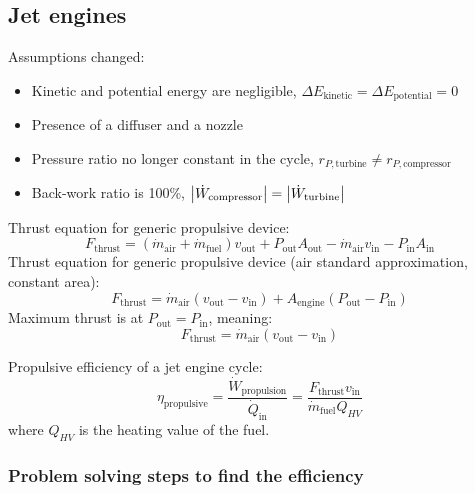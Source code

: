 \documentclass[10pt, twocolumn]{article}
\begin{document}
\subsection{Jet engines}
Assumptions changed:
\begin{itemize}
  \item Kinetic and potential energy are negligible, \(\Delta E_\mathrm{kinetic} = \Delta E_\mathrm{potential} = 0\)
  \item Presence of a diffuser and a nozzle
  \item Pressure ratio no longer constant in the cycle, \(r_{P,\mathrm{turbine}} \neq r_{P,\mathrm{compressor}}\)
  \item Back-work ratio is 100\%, \(\left| \dot{W}_\mathrm{compressor} \right| = \left| \dot{W}_\mathrm{turbine} \right|\)
\end{itemize}

Thrust equation for generic propulsive device:
\[
  F_\mathrm{thrust} = (\dot{m}_\mathrm{air} + \dot{m}_\mathrm{fuel})v_\mathrm{out} + P_\mathrm{out}A_\mathrm{out} - \dot{m}_\mathrm{air}v_\mathrm{in} - P_\mathrm{in}A_\mathrm{in}
\]
Thrust equation for generic propulsive device (air standard approximation, constant area):
\[
  F_\mathrm{thrust} = \dot{m}_\mathrm{air} (v_\mathrm{out} - v_\mathrm{in}) + A_\mathrm{engine} (P_\mathrm{out} - P_\mathrm{in})
\]
Maximum thrust is at \(P_\mathrm{out} = P_\mathrm{in}\), meaning:
\[
  F_\mathrm{thrust} = \dot{m}_\mathrm{air} (v_\mathrm{out} - v_\mathrm{in})
\]

Propulsive efficiency of a jet engine cycle:
\[
  \eta_\mathrm{propulsive} = \frac{\dot{W}_\mathrm{propulsion}}{\dot{Q}_\mathrm{in}} = \frac{F_\mathrm{thrust} v_\mathrm{in}}{\dot{m}_\mathrm{fuel} Q_{HV}}
\]
where \(Q_{HV}\) is the heating value of the fuel.


\subsubsection{Problem solving steps to find the efficiency}
\end{document}
